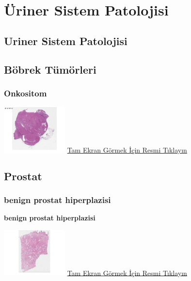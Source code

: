 \documentclass[
  letterpaper,
  DIV=11,
  numbers=noendperiod]{scrreprt}
\begin{document}
\part{Üriner Sistem Patolojisi}

\hypertarget{sec-uriner-sistem-patolojisi}{%
\chapter{Uriner Sistem Patolojisi}\label{sec-uriner-sistem-patolojisi}}

\hypertarget{sec-bobrek-tumorleri}{%
\chapter{Böbrek Tümörleri}\label{sec-bobrek-tumorleri}}

\hypertarget{sec-bobrek-onkositom}{%
\section{Onkositom}\label{sec-bobrek-onkositom}}

\href{https://images.patolojiatlasi.com/kidneyoncocytoma/HE.html}{\includegraphics[width=0.25\textwidth,height=\textheight]{./screenshots/kidneyoncocytoma_screenshot.png}}
\href{https://images.patolojiatlasi.com/kidneyoncocytoma/HE.html}{Tam
Ekran Görmek İçin Resmi Tıklayın}

\hypertarget{sec-prostat}{%
\chapter{Prostat}\label{sec-prostat}}

\hypertarget{sec-benign-prostat-hiperplazisi}{%
\section{benign prostat
hiperplazisi}\label{sec-benign-prostat-hiperplazisi}}

\textbf{benign prostat hiperplazisi}

\href{https://images.patolojiatlasi.com/benign-prostate-hyperplasia/HE.html}{\includegraphics[width=0.25\textwidth,height=\textheight]{./screenshots/benign-prostate-hyperplasia_screenshot.png}}
\href{https://images.patolojiatlasi.com/benign-prostate-hyperplasia/HE.html}{Tam
Ekran Görmek İçin Resmi Tıklayın}
\end{document}
